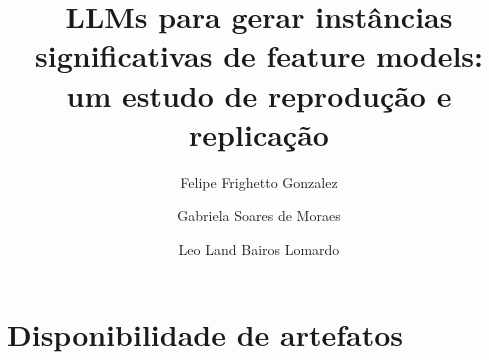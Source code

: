 \documentclass[sigconf,nonacm]{acmart}
\begin{document}
\title{LLMs para gerar instâncias significativas de feature models:\\ um estudo de reprodução e replicação}

\author{Felipe Frighetto Gonzalez}

\author{Gabriela Soares de Moraes}

\author{Leo Land Bairos Lomardo}

\renewcommand{\shortauthors}{Gonzalez, Moraes e Lomardo}




\maketitle










\section*{Disponibilidade de artefatos}




\end{document}
